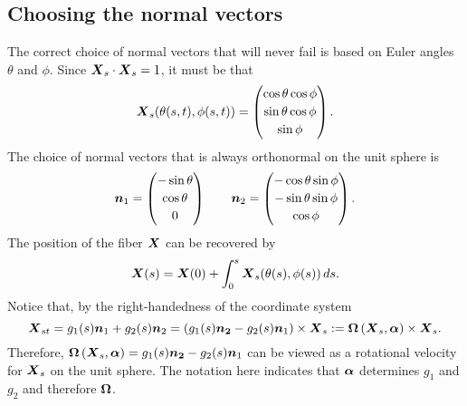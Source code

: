 \subsection{Choosing the normal vectors}
The correct choice of normal vectors that will never fail is based on Euler angles $\theta$ and $\phi$. Since $\boldsymbol{X}_s \cdot \boldsymbol{X}_s=1$, it must be that
\begin{equation}
\boldsymbol{X}_s(\theta(s,t),\phi(s,t)) = \begin{pmatrix} \cos{\theta} \cos{\phi}\\[2 pt] \sin{\theta} \cos{\phi} \\[2 pt] \sin{\phi} \end{pmatrix}.
\end{equation}
The choice of normal vectors that is always orthonormal on the unit sphere is
\begin{equation}
\boldsymbol{n}_1 =  \begin{pmatrix} -\sin{\theta}\\[2 pt] \cos{\theta}\\[2 pt]0 \end{pmatrix} \qquad \boldsymbol{n}_2 =  \begin{pmatrix} -\cos{\theta} \sin{\phi}\\[2 pt] -\sin{\theta} \sin{\phi} \\[2 pt] \cos{\phi} \end{pmatrix}. 
\end{equation}
The position of the fiber $\boldsymbol{X}$ can be recovered by 
\begin{equation}
\label{eq:XfromXs}
\boldsymbol{X}(s)= \boldsymbol{X}(0)+\int_0^s \boldsymbol{X}_s(\theta(s),\phi(s)) \, ds. 
\end{equation}
Notice that, by the right-handedness of the coordinate system
\begin{equation}
\label{eq:Xsupdate}
\boldsymbol{X}_{st} = g_1(s)\boldsymbol{n}_1 + g_2(s) \boldsymbol{n}_2 = \left(g_1(s)\boldsymbol{n_2}-g_2(s)\boldsymbol{n}_1\right) \times \boldsymbol{X}_s:=\boldsymbol{\Omega}\left(\boldsymbol{X}_s, \boldsymbol{\alpha}\right) \times \boldsymbol{X}_s. 
\end{equation}
Therefore, $\boldsymbol{\Omega}\left(\boldsymbol{X}_s, \boldsymbol{\alpha}\right)=g_1(s)\boldsymbol{n_2}-g_2(s)\boldsymbol{n}_1$ can be viewed as a rotational velocity for $\boldsymbol{X}_s$ on the unit sphere. The notation here indicates that $\boldsymbol{\alpha}$ determines $g_1$ and $g_2$ and therefore $\boldsymbol{\Omega}$. 
